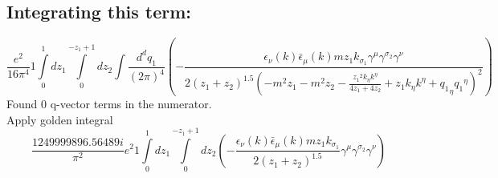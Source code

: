 \subsection*{Integrating this term:}
\begin{dmath}\frac{e^{2}}{16 \pi^{4}}1\int\limits_{ 0 }^{ 1 } d{ z_{ 1 } }\int\limits_{ 0 }^{ - { z_{ 1 } } + 1 } d{ z_{ 2 } }\int\frac{d^d q_1 }{ (2\pi)^4 }\left(- \frac{\epsilon_{ \nu }({ k }) \bar{\epsilon}_{ \mu }({ k }) m { z_{ 1 } } { { k }_{ \sigma_1 } } { \gamma^{ \mu } } { \gamma^{ \sigma_2 } } { \gamma^{ \nu } }}{2 \left({ z_{ 1 } } + { z_{ 2 } }\right)^{1.5} \left(- m^{2} { z_{ 1 } } - m^{2} { z_{ 2 } } - \frac{{ z_{ 1 } }^{2} { { k }_{ \eta } } { { k }^{ \eta } }}{4 { z_{ 1 } } + 4 { z_{ 2 } }} + { z_{ 1 } } { { k }_{ \eta } } { { k }^{ \eta } } + { { q_1 }_{ \eta } } { { q_1 }^{ \eta } }\right)^{2}}\right)\end{dmath}
Found 0 q-vector terms in the numerator.\\
Apply golden integral
\begin{dmath}\frac{1249999896.56489 i}{\pi^{2}} e^{2}1\int\limits_{ 0 }^{ 1 } d{ z_{ 1 } }\int\limits_{ 0 }^{ - { z_{ 1 } } + 1 } d{ z_{ 2 } }\left(- \frac{\epsilon_{ \nu }({ k }) \bar{\epsilon}_{ \mu }({ k }) m { z_{ 1 } } { { k }_{ \sigma_1 } }}{2 \left({ z_{ 1 } } + { z_{ 2 } }\right)^{1.5}} { \gamma^{ \mu } } { \gamma^{ \sigma_2 } } { \gamma^{ \nu } }\right)\end{dmath}
